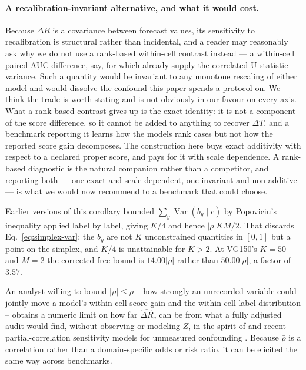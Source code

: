 \paragraph{A recalibration-invariant alternative, and what it would cost.}
Because $\Delta R$ is a covariance between forecast values, its sensitivity to
recalibration is structural rather than incidental, and a reader may reasonably ask why we
do not use a rank-based within-cell contrast instead --- a within-cell paired AUC
difference, say, for which \citet{delong1988comparing} already supply the
correlated-U-statistic variance. Such a quantity would be invariant to any monotone
rescaling of either model and would dissolve the confound this paper spends a protocol on.
We think the trade is worth stating and is not obviously in our favour on every axis.
What a rank-based contrast gives up is the exact identity: it is not a component of the
score difference, so it cannot be added to anything to recover $\Delta T$, and a benchmark
reporting it learns how the models rank cases but not how the reported score gain
decomposes. The construction here buys exact additivity with respect to a declared proper
score, and pays for it with scale dependence. A rank-based diagnostic is the natural
companion rather than a competitor, and reporting both --- one exact and scale-dependent,
one invariant and non-additive --- is what we would now recommend to a benchmark that
could choose.



Earlier versions of this corollary bounded $\sum_y\operatorname{Var}(b_y\mid c)$ by
Popoviciu's inequality applied label by label, giving $K/4$ and hence $|\rho|KM/2$. That
discards Eq.~\eqref{eq:simplex-var}: the $b_y$ are not $K$ unconstrained quantities in
$[0,1]$ but a point on the simplex, and $K/4$ is unattainable for $K>2$. At VG150's
$K=50$ and $M=2$ the corrected free bound is $14.00|\rho|$ rather than $50.00|\rho|$, a
factor of $3.57$.

An analyst willing to bound $|\rho|\le\bar\rho$ -- how strongly an unrecorded variable
could jointly move a model's within-cell score gain and the within-cell label
distribution -- obtains a numeric limit on how far $\widehat{\Delta R}_c$ can be from
what a fully adjusted audit would find, without observing or modeling $Z$, in the spirit
of \citet{rosenbaum2002observational} and recent partial-correlation sensitivity models
for unmeasured confounding \citep{cinelli2020making}.
Because $\bar\rho$ is a correlation rather than a domain-specific odds or risk ratio, it
can be elicited the same way across benchmarks.

